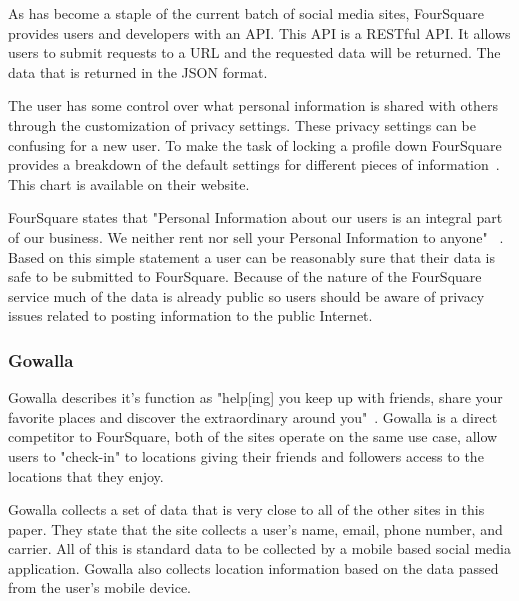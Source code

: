 As has become a staple of the current batch of social media sites, FourSquare
provides users and developers with an API. This API is a RESTful API. It allows
users to submit requests to a URL and the requested data will be returned. The
data that is returned in the JSON format.

The user has some control over what personal information is shared with others
through the customization of privacy settings. These privacy settings can be
confusing for a new user. To make the task of locking a profile down FourSquare
provides a breakdown of the default settings for different pieces of
information~\cite{fschart}. This chart is available on their website.

FourSquare states that "Personal Information about our users is an integral part
of our business. We neither rent nor sell your Personal Information to anyone"
~\cite{fspp}. Based on this simple statement a user can be reasonably sure that
their data is safe to be submitted to FourSquare. Because of the nature of the
FourSquare service much of the data is already public so users should be aware
of privacy issues related to posting information to the public Internet.%


\subsubsection{Gowalla} 
Gowalla describes it's function as "help[ing] you keep up with friends, share
your favorite places and discover the extraordinary around you"~\cite{goblog}.
Gowalla is a direct competitor to FourSquare, both of the sites operate on the
same use case, allow users to "check-in" to locations giving their friends and
followers access to the locations that they enjoy.

Gowalla collects a set of data that is very close to all of the other sites in
this paper. They state that the site collects a user's name, email, phone number, and
carrier. All of this is standard data to be collected by a mobile based social
media application. Gowalla also collects location information based on the data
passed from the user's mobile device.

